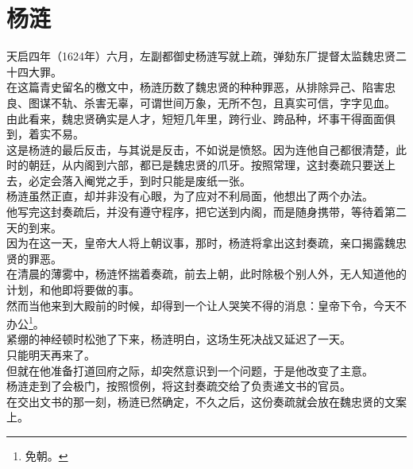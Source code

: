 \section{杨涟}
\ifnum{}
	\begin{multicols}{\theparacolNo}
\fi
天启四年（1624年）六月，左副都御史杨涟写就上疏，弹劾东厂提督太监魏忠贤二十四大罪。\\

在这篇青史留名的檄文中，杨涟历数了魏忠贤的种种罪恶，从排除异己、陷害忠良、图谋不轨、杀害无辜，可谓世间万象，无所不包，且真实可信，字字见血。\\

由此看来，魏忠贤确实是人才，短短几年里，跨行业、跨品种，坏事干得面面俱到，着实不易。\\

这是杨涟的最后反击，与其说是反击，不如说是愤怒。因为连他自己都很清楚，此时的朝廷，从内阁到六部，都已是魏忠贤的爪牙。按照常理，这封奏疏只要送上去，必定会落入阉党之手，到时只能是废纸一张。\\

杨涟虽然正直，却并非没有心眼，为了应对不利局面，他想出了两个办法。\\

他写完这封奏疏后，并没有遵守程序，把它送到内阁，而是随身携带，等待着第二天的到来。\\

因为在这一天，皇帝大人将上朝议事，那时，杨涟将拿出这封奏疏，亲口揭露魏忠贤的罪恶。\\

在清晨的薄雾中，杨涟怀揣着奏疏，前去上朝，此时除极个别人外，无人知道他的计划，和他即将要做的事。\\

然而当他来到大殿前的时候，却得到一个让人哭笑不得的消息：皇帝下令，今天不办公\footnote{免朝。}。\\

紧绷的神经顿时松弛了下来，杨涟明白，这场生死决战又延迟了一天。\\

只能明天再来了。\\

但就在他准备打道回府之际，却突然意识到一个问题，于是他改变了主意。\\

杨涟走到了会极门，按照惯例，将这封奏疏交给了负责递文书的官员。\\

在交出文书的那一刻，杨涟已然确定，不久之后，这份奏疏就会放在魏忠贤的文案上。\\


\end{multicols}
